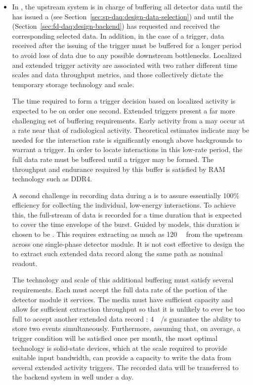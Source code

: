\begin{itemize}
\item In , the upstream  system is in charge of buffering all
detector data until the  has issued a 
(see Section~\ref{sec:sp-daq:design-data-selection}) and until the
 (Section~\ref{sec:fd-daq:design-backend}) has requested
and received the corresponding selected data. 
In addition, in the case of a  trigger, data received after
the issuing of the trigger must be buffered for a longer period to
avoid loss of data due to any possible downstream
bottlenecks. Localized and extended trigger activity are associated
with two rather different time scales and data throughput metrics, and
those collectively dictate the temporary storage technology and scale. 

The time required to form a trigger decision based on localized activity is expected to be on order one second.
Extended triggers present a far more challenging set of buffering requirements.  
Early activity from a  may occur at a rate near that of radiological activity.
Theoretical estimates indicate \snbpretime may be needed for the  interaction rate is significantly enough above backgrounds to warrant a trigger.
In order to locate interactions in this low-rate period, the full data rate must be buffered until a  trigger may be formed.
The throughput and endurance required by this buffer is satisfied by RAM technology such as DDR4.

A second challenge in recording data during a  is to assure essentially 100\% efficiency for collecting the individual, low-energy interactions. 
To achieve this, the full-stream of data is recorded for a time duration that is expected to cover the time envelope of the burst.
Guided by  models, this duration is chosen to be \snbtime.
This requires extracting as much as \SI{120}{\tera\byte} from the  upstream  across one single-phase detector module.
It is not cost effective to design the  to extract such extended data record along the same path as nominal readout.

The technology and scale of this additional buffering must satisfy several requirements. 
Each  must accept the full data rate of the portion of the detector module it services.
The media must have sufficient capacity and allow for sufficient extraction throughput so that it is unlikely to ever be too full to accept another extended data record : \SI{4}{\tera\bit/\second} guarantee the ability to store two  events simultaneously.
Furthermore, assuming that, on average, a  trigger condition will be
satisfied once per month, the most optimal technology is
solid-state  devices, which at the scale required to provide suitable input bandwidth, can provide a capacity to write the data from several extended activity triggers. The recorded data will be transferred to the backend system in well under a day.


\end{itemize}
